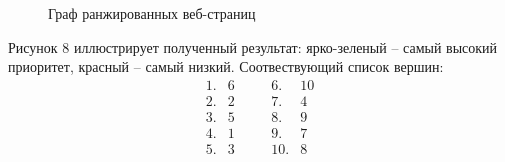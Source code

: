 \documentclass[a5paper, 10pt]{article}
\theoremstyle{definition}
\theoremstyle{plain}
\theoremstyle{remark}
\begin{document}
\begin{figure}[h!]
\caption{Граф ранжированных веб-страниц}
\end{figure}
\newpage
 Рисунок 8 иллюстрирует полученный результат: ярко-зеленый -- самый высокий приоритет, красный -- самый низкий. Соотвествующий список вершин:
\begin{equation*}
\begin{matrix}
1. & 6 & \,\,\,\,\,\, & 6. & 10\\
2. & 2  & \,\,\,\,\,\, & 7. & 4\\
3. & 5  & \,\,\,\,\,\, & 8. & 9\\
4. & 1  & \,\,\,\,\,\, & 9. & 7\\
5. & 3  & \,\,\,\,\,\, &10. & 8
\end{matrix}
\end{equation*}
\end{document}
